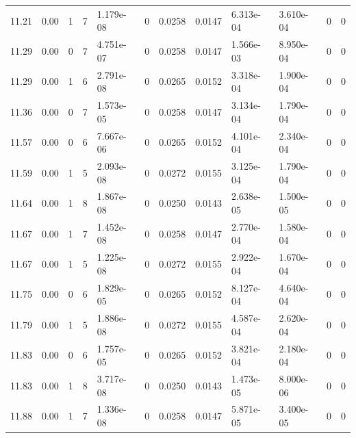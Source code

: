 \documentclass[preview]{standalone}
\begin{document}
{{{\begin{tabular}{L{1.2cm}C{1.2cm} C{0.3cm}C{0.5cm} C{1.4cm}C{1.4cm} C{1.4cm}C{1.4cm} C{1.6cm}C{1.6cm} C{1.6cm}C{1.6cm}}
  11.21  &  0.00  & 1     &  7 &  1.179e-08  & 0  &  0.0258&   0.0147& 6.313e-04 & 3.610e-04   &  0 & 0  \\ 
  11.29  &  0.00  & 0     &  7 &  4.751e-07  & 0  &  0.0258&   0.0147& 1.566e-03 & 8.950e-04   &  0 & 0  \\ 
  11.29  &  0.00  & 1     &  6 &  2.791e-08  & 0  &  0.0265&   0.0152& 3.318e-04 & 1.900e-04   &  0 & 0  \\ 
  11.36  &  0.00  & 0     &  7 &  1.573e-05  & 0  &  0.0258&   0.0147& 3.134e-04 & 1.790e-04   &  0 & 0  \\ 
  11.57  &  0.00  & 0     &  6 &  7.667e-06  & 0  &  0.0265&   0.0152& 4.101e-04 & 2.340e-04   &  0 & 0  \\ 
  11.59  &  0.00  & 1     &  5 &  2.093e-08  & 0  &  0.0272&   0.0155& 3.125e-04 & 1.790e-04   &  0 & 0  \\ 
  11.64  &  0.00  & 1     &  8 &  1.867e-08  & 0  &  0.0250&   0.0143& 2.638e-05 & 1.500e-05   &  0 & 0  \\ 
  11.67  &  0.00  & 1     &  7 &  1.452e-08  & 0  &  0.0258&   0.0147& 2.770e-04 & 1.580e-04   &  0 & 0  \\ 
  11.67  &  0.00  & 1     &  5 &  1.225e-08  & 0  &  0.0272&   0.0155& 2.922e-04 & 1.670e-04   &  0 & 0  \\ 
  11.75  &  0.00  & 0     &  6 &  1.829e-05  & 0  &  0.0265&   0.0152& 8.127e-04 & 4.640e-04   &  0 & 0  \\ 
  11.79  &  0.00  & 1     &  5 &  1.886e-08  & 0  &  0.0272&   0.0155& 4.587e-04 & 2.620e-04   &  0 & 0  \\ 
  11.83  &  0.00  & 0     &  6 &  1.757e-05  & 0  &  0.0265&   0.0152& 3.821e-04 & 2.180e-04   &  0 & 0  \\ 
  11.83  &  0.00  & 1     &  8 &  3.717e-08  & 0  &  0.0250&   0.0143& 1.473e-05 & 8.000e-06   &  0 & 0  \\ 
  11.88  &  0.00  & 1     &  7 &  1.336e-08  & 0  &  0.0258&   0.0147& 5.871e-05 & 3.400e-05   &  0 & 0  \\ 
\hline 
\end{tabular} 

}}}
\end{document}
